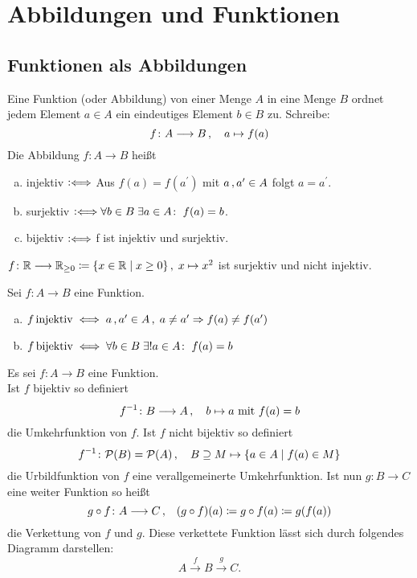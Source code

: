 \documentclass[../ana1.tex]{subfiles}
\begin{document}
\setcounter{section}{3}

\section{Abbildungen und Funktionen}

\subsection{Funktionen als Abbildungen}

\begin{defi}
	Eine Funktion (oder Abbildung) von einer Menge \(A\) in eine Menge \(B\) ordnet jedem Element \(a \in A\)
	ein eindeutiges Element \(b \in B\) zu. Schreibe:
	\[f \colon A \longrightarrow B \operatorname{,} \quad a \mapsto f(a)\]
	Die Abbildung \(f \colon A \longrightarrow B\) heißt
	\begin{enumerate}[(a)]
		\item injektiv \(\mathrel{\vcentcolon\Longleftrightarrow}\) Aus \(f(a) = f(a^\prime)\) mit \(a \operatorname{,} a^\prime \in A\) folgt \(a = a^\prime\).
		\item surjektiv \(\mathrel{\vcentcolon\Longleftrightarrow} \forall b \in B \; \exists a \in A \colon \; f(a) = b\).
		\item bijektiv \(\mathrel{\vcentcolon\Longleftrightarrow}\) f ist injektiv und surjektiv. 
	\end{enumerate}
\end{defi}

\begin{bsp}
	\(f \colon \mathbb{R} \longrightarrow \mathbb{R}_{\geq 0} \coloneqq \{x \in \mathbb{R} \; \vert \; x \geq 0\} \operatorname{,} \; x \mapsto x^{2}\) ist surjektiv und nicht injektiv.
\end{bsp}

\begin{bem}
	Sei \(f \colon A \longrightarrow B\) eine Funktion.
	\begin{enumerate}[(a)]
		\item \(f \operatorname{injektiv} \iff a \operatorname{,} a^\prime \in A \operatorname{,} \; a \neq a^\prime \Rightarrow f(a) \neq f(a^\prime)\)
		\item \(f \operatorname{bijektiv} \iff \forall b \in B \; \exists! a \in A \colon \; f(a) = b\)
	\end{enumerate}
\end{bem}

\begin{defi*}
	Es sei \(f \colon A \longrightarrow B\) eine Funktion.\\
	Ist \(f\) bijektiv so definiert
	\[\inverse{f} \colon B \longrightarrow A \ko \quad b \mapsto a \text{ mit } f(a) = b\]
	die Umkehrfunktion von \(f\).
	Ist \(f\) nicht bijektiv so definiert
	\[\inverse{f} \colon \PO(B) = \PO(A) \ko \quad B \supseteq M \mapsto \set{a \in A \; \vert \; f(a) \in M}\]
	die Urbildfunktion von \(f\) eine verallgemeinerte Umkehrfunktion.
	Ist nun \(g \colon B \longrightarrow C\) eine weiter Funktion so heißt
	\[g \circ f \colon A \longrightarrow C \operatorname{,} \quad (g \circ f)(a) \coloneqq g \circ f(a) \coloneqq g(f(a))\]
	die Verkettung von \(f\) und \(g\). Diese verkettete Funktion lässt sich durch folgendes Diagramm darstellen:
	\[A \overset{f}{\longrightarrow} B \overset{g}{\longrightarrow} C.\]
\end{defi*}
\end{document}
